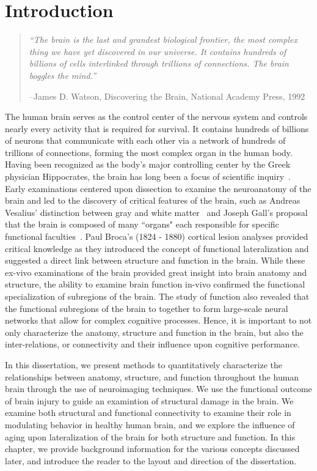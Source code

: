 
\chapter{Introduction}
\label{chap_intro}
\begin{quote}
{\em ``The brain is the last and grandest biological frontier, the most complex thing we have yet discovered in our universe. It contains hundreds of billions of cells interlinked through trillions of connections. The brain boggles the mind.''}  

--James D. Watson, Discovering the Brain, National Academy Press, 1992
\end{quote}

The human brain serves as the control center of the nervous system and controls nearly every activity that is required for survival. It contains hundreds of billions of neurons that communicate with each other via a network of hundreds of trillions of connections, forming the most complex organ in the human body. Having been recognized as the body's major controlling center by the Greek physician Hippocrates, the brain has long been a focus of scientific inquiry~\cite{Finger2005}. Early examinations centered upon dissection to examine the neuroanatomy of the brain and led to the discovery of critical features of the brain, such as Andreas Vesalius' distinction between gray and white matter~\cite{Vesalius1543} and Joseph Gall's proposal that the brain is composed of many ``organs" each responsible for specific functional faculties~\cite{Gall1810}. Paul Broca's (1824 - 1880) cortical lesion analyses provided critical knowledge as they introduced the concept of functional lateralization and suggested a direct link between structure and function in the brain.  While these ex-vivo examinations of the brain provided great insight into brain anatomy and structure, the ability to examine brain function in-vivo confirmed the functional specialization of subregions of the brain. The study of function also revealed that the functional subregions of the brain to together to form large-scale neural networks that allow for complex cognitive processes. Hence, it is important to not only characterize the anatomy, structure and function in the brain, but also the inter-relations, or connectivity and their influence upon cognitive performance.

In this dissertation, we present methods to quantitatively characterize the relationships between anatomy, structure, and function throughout the human brain through the use of neuroimaging techniques. We use the functional outcome of brain injury to guide an examintion of structural damage in the brain.  We examine both structural and functional connectivity to examine their role in modulating behavior in healthy human brain, and we explore the influence of aging upon lateralization of the brain for both structure and function. In this chapter, we provide background information for the various concepts discussed later, and introduce the reader to the layout and direction of the dissertation.

